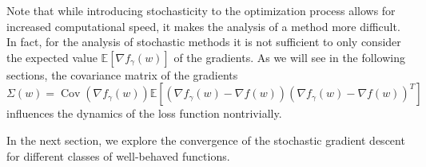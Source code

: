 \documentclass[12pt]{article}
\theoremstyle{definition}
\newtheorem{definition}[definition]{Definition}
\numberwithin{equation}{section}
\newcommand{\R}{\mathbb{R}}
\newcommand{\ev}[1]{\mathbb{E}\left[{#1}\right]}
\DeclareMathOperator{\Cov}{Cov}
\begin{document}
Note that while introducing stochasticity to the optimization process allows for increased computational speed, it makes the analysis of a method more difficult. In fact, for the analysis of stochastic methods it is not sufficient to only consider the expected value $\ev{\nabla f_{\gamma}(w)}$ of the gradients. As we will see in the following sections, the covariance matrix of the gradients $\Sigma(w) = \Cov(\nabla f_\gamma(w)) \mathbb{E}[(\nabla f_{\gamma}(w) - \nabla f(w)){(\nabla f_{\gamma}(w) - \nabla f(w))}^T]$ influences the dynamics of the loss function nontrivially.


In the next section, we explore the convergence of the stochastic gradient descent for different classes of well-behaved functions.
\end{document}
